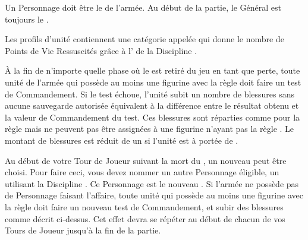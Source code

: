 

\startarmywiderules

\armywideruleentry{\masterofundeath}

Un Personnage doit être le \textbf{\master{}} de l'armée. Au début de la partie, le Général est toujours le \master{}.


\armywideruleentry{\invocation}

Les profils d'unité contiennent une catégorie appelée \invocation{} qui donne le nombre de Points de Vie Ressuscités grâce à l'\necromancysignaturespell{} de la Discipline \necromancy{}.

\closearmywiderules

\vspace*{1.5cm}
\startarmyspecialrules

\armyspecialruleentry{\ashestoashes}

À la fin de n'importe quelle phase où le \master{} est retiré du jeu en tant que perte, toute unité de l'armée qui possède au moins une figurine avec la règle \ashestoashes{} doit faire un test de Commandement. Si le test échoue, l'unité subit un nombre de blessures sans aucune sauvegarde autorisée équivalent à la différence entre le résultat obtenu et la valeur de Commandement du test. Ces blessures sont réparties comme pour la règle \unstable{} mais ne peuvent pas être assignées à une figurine n'ayant pas la règle \ashestoashes{}. Le montant de blessures est réduit de un si l'unité est à portée de \holdyourground{}.

Au début de votre Tour de Joueur suivant la mort du \master{}, un nouveau \master{} peut être choisi. Pour faire ceci, vous devez nommer un autre Personnage éligible, un \wizard{} utilisant la Discipline \necromancy{}. Ce Personnage est le nouveau \master{}. Si l'armée ne possède pas de Personnage faisant l'affaire, toute unité qui possède au moins une figurine avec la règle \ashestoashes{} doit faire un nouveau test de Commandement, et subir des blessures comme décrit ci-dessus. Cet effet devra se répéter au début de chacun de vos Tours de Joueur jusqu'à la fin de la partie.

\armyspecialruleentry{\newrule{\wailofwoe}}

